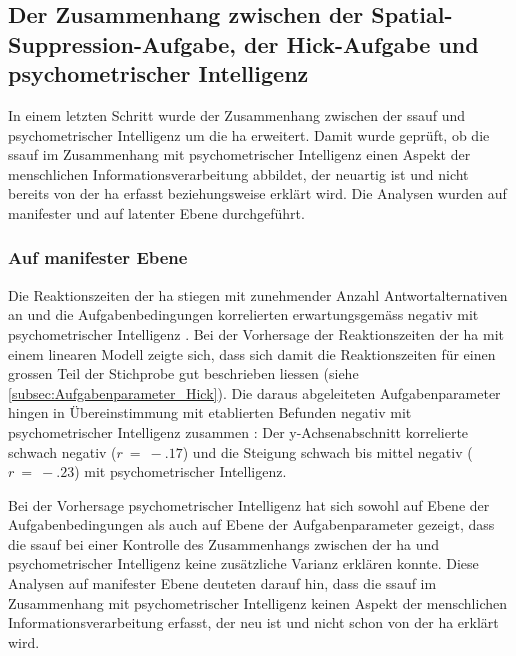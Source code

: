 \documentclass[11pt, twoside, a4paper]{book}		%
\begin{document}
\subsection{Der Zusammenhang zwischen der Spatial-Sup\-pres\-sion-Aufgabe, der Hick-Aufgabe und psy\-cho\-me\-trischer In\-tel\-li\-genz}

In einem letzten Schritt wurde der Zusammenhang zwischen der \gls{ssauf} und psychometrischer Intelligenz um die \gls{ha} erweitert. Damit wurde geprüft, ob die \gls{ssauf} im Zusammenhang mit psychometrischer Intelligenz einen Aspekt der menschlichen Informationsverarbeitung abbildet, der neuartig ist und nicht bereits von der \gls{ha} erfasst beziehungsweise erklärt wird. Die Analysen wurden auf manifester und auf latenter Ebene durchgeführt.

\subsubsection*{Auf manifester Ebene}


Die Reaktionszeiten der \gls{ha} stiegen mit zunehmender Anzahl Antwortalternativen an \citep{Hick1952} und die Aufgabenbedingungen korrelierten  erwartungsgemäss negativ mit psychometrischer Intelligenz \citep[$r~=~-.19$ bis $-.28$; vgl.][]{Sheppard2008}.
Bei der Vorhersage der Reaktionszeiten der \gls{ha} mit einem linearen Modell zeigte sich, dass sich damit die Reaktionszeiten für einen grossen Teil der Stichprobe gut beschrieben liessen (siehe \autoref{subsec:Aufgabenparameter_Hick}). Die daraus abgeleiteten Aufgabenparameter hingen in Übereinstimmung mit etablierten Befunden negativ mit psychometrischer Intelligenz zusammen \citep[vgl.][]{Roth1964, Jensen1982b, Jensen1987a, Jensen1998b, Neubauer1997a, Neubauer1997b, Rammsayer2007}: Der y-Ach\-sen\-ab\-schnitt korrelierte schwach negativ ($r~=~-.17$) und die Steigung schwach bis mittel negativ ($r~=~-.23$) mit psychometrischer Intelligenz. 

Bei der Vorhersage psychometrischer Intelligenz hat sich sowohl auf Ebene der Aufgabenbedingungen als auch auf Ebene der Aufgabenparameter gezeigt, dass die \gls{ssauf} bei einer Kontrolle des Zusammenhangs zwischen der \gls{ha} und psychometrischer Intelligenz keine zusätzliche Varianz erklären konnte.
Diese Analysen auf manifester Ebene deuteten darauf hin, dass die \gls{ssauf} im Zusammenhang mit psychometrischer Intelligenz keinen Aspekt der menschlichen Informationsverarbeitung erfasst, der neu ist und nicht schon von der \gls{ha} erklärt wird.
\end{document}
